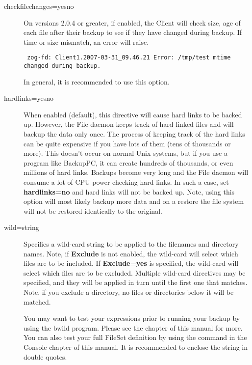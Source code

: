 \begin{description}
\item [checkfilechanges=yes\vb{}no]
   On versions 2.0.4 or greater, 
   if enabled, the Client will check size, age of each file after 
   their backup to see if they have changed during backup. If time 
   or size mismatch, an error will raise.

\begin{verbatim}
 zog-fd: Client1.2007-03-31_09.46.21 Error: /tmp/test mtime changed during backup.
\end{verbatim}

   In general, it is recommended to use this option.

\item [hardlinks=yes\vb{}no]
   When enabled (default), this directive will cause hard links to be 
   backed up. However, the File daemon keeps track of hard linked files and
   will backup the data only once. The process of keeping track of the 
   hard links can be quite expensive if you have lots of them (tens of
   thousands or more). This doesn't occur on normal Unix systems, but if
   you use a program like BackupPC, it can create hundreds of thousands, or
   even millions of hard links. Backups become very long and the File daemon
   will consume a lot of CPU power checking hard links.  In such a case,
   set {\bf hardlinks=no} and hard links will not be backed up.  Note, using
   this option will most likely backup more data and on a restore the file
   system will not be restored identically to the original.

\item [wild=\lt{}string\gt{}]
   Specifies a wild-card string to be applied to the filenames and
   directory names.  Note, if {\bf Exclude} is not enabled, the wild-card
   will select which files are to be included.  If {\bf Exclude=yes} is
   specified, the wild-card will select which files are to be excluded.
   Multiple wild-card directives may be specified, and they will be applied
   in turn until the first one that matches.  Note, if you exclude a
   directory, no files or directories below it will be matched.

   You may want to test your expressions prior to running your
   backup by using the bwild program. Please see the
    chapter of this manual for
   more. You can also test your full FileSet definition by using
   the  command in the Console        
   chapter of this manual.
   It is recommended to enclose the string in double quotes.


\end{description}
